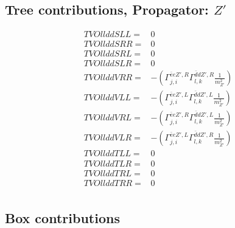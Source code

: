 \documentclass[A4,landscape]{article}
\begin{document}
\subsection{Tree contributions, Propagator: ${Z'}$} 

\begin{align} 
  TVOllddSLL= & 0 \\ 
  TVOllddSRR= & 0 \\ 
  TVOllddSRL= & 0 \\ 
  TVOllddSLR= & 0 \\ 
  TVOllddVRR= & -(\Gamma^{\bar{e}e {Z'} ,R}_{j, i} \Gamma^{\bar{d}d {Z'} ,R}_{l, k} \frac{1}{m^2_{{Z'}}}) \\ 
  TVOllddVLL= & -(\Gamma^{\bar{e}e {Z'} ,L}_{j, i} \Gamma^{\bar{d}d {Z'} ,L}_{l, k} \frac{1}{m^2_{{Z'}}}) \\ 
  TVOllddVRL= & -(\Gamma^{\bar{e}e {Z'} ,R}_{j, i} \Gamma^{\bar{d}d {Z'} ,L}_{l, k} \frac{1}{m^2_{{Z'}}}) \\ 
  TVOllddVLR= & -(\Gamma^{\bar{e}e {Z'} ,L}_{j, i} \Gamma^{\bar{d}d {Z'} ,R}_{l, k} \frac{1}{m^2_{{Z'}}}) \\ 
  TVOllddTLL= & 0 \\ 
  TVOllddTLR= & 0 \\ 
  TVOllddTRL= & 0 \\ 
  TVOllddTRR= & 0 \\ 
\end{align} 
\subsection{Box contributions} 
\end{document}
